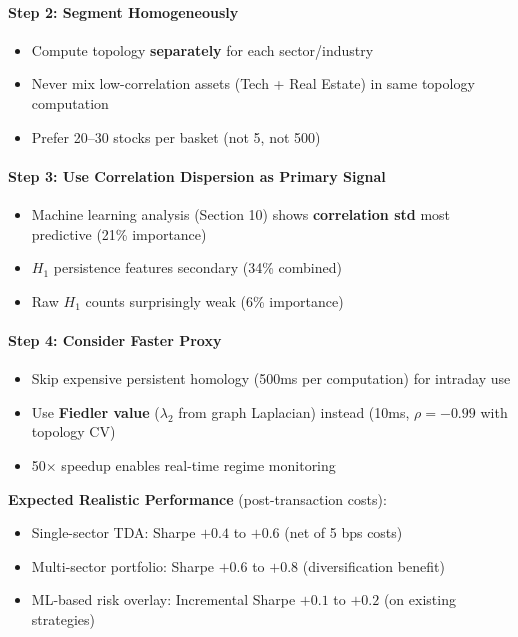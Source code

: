 \paragraph{Step 2: Segment Homogeneously}
\begin{itemize}
\item Compute topology \textbf{separately} for each sector/industry
\item Never mix low-correlation assets (Tech + Real Estate) in same topology computation
\item Prefer 20--30 stocks per basket (not 5, not 500)
\end{itemize}

\paragraph{Step 3: Use Correlation Dispersion as Primary Signal}
\begin{itemize}
\item Machine learning analysis (Section 10) shows \textbf{correlation std} most predictive (21\% importance)
\item $H_1$ persistence features secondary (34\% combined)
\item Raw $H_1$ counts surprisingly weak (6\% importance)
\end{itemize}

\paragraph{Step 4: Consider Faster Proxy}
\begin{itemize}
\item Skip expensive persistent homology (500ms per computation) for intraday use
\item Use \textbf{Fiedler value} ($\lambda_2$ from graph Laplacian) instead (10ms, $\rho = -0.99$ with topology CV)
\item 50$\times$ speedup enables real-time regime monitoring
\end{itemize}

\textbf{Expected Realistic Performance} (post-transaction costs):
\begin{itemize}
\item Single-sector TDA: Sharpe $+0.4$ to $+0.6$ (net of 5 bps costs)
\item Multi-sector portfolio: Sharpe $+0.6$ to $+0.8$ (diversification benefit)
\item ML-based risk overlay: Incremental Sharpe $+0.1$ to $+0.2$ (on existing strategies)
\end{itemize}

